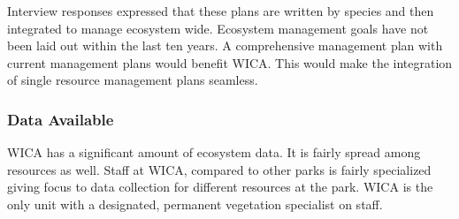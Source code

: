 Interview responses expressed that these plans are written by species and then integrated to manage ecosystem wide. 
Ecosystem management goals have not been laid out within the last ten years. 
A comprehensive management plan with current management plans would benefit WICA. 
This would make the integration of single resource management plans seamless.

\subsubsection{Data Available}

WICA has a significant amount of ecosystem data. 
It is fairly spread among resources as well. 
Staff at WICA, compared to other parks is fairly specialized giving focus to data collection for different resources at the park. 
WICA is the only unit with a designated, permanent vegetation specialist on staff.


